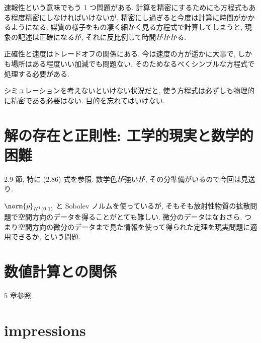 \documentclass[openany, a4paper, oneside]{jsbook}
\begin{document}
速報性という意味でもう 1 つ問題がある.
計算を精密にするためにも方程式もある程度精密にしなければいけないが, 精密にし過ぎると今度は計算に時間がかかるようになる.
媒質の様子をもの凄く細かく見る方程式で計算してしまうと, 現象の記述は正確になるが, それに反比例して時間がかかる.

正確性と速度はトレードオフの関係にある.
今は速度の方が遥かに大事で, しかも場所はある程度いい加減でも問題ない.
そのためなるべくシンプルな方程式で処理する必要がある.

シミュレーションを考えないといけない状況だと, 使う方程式は必ずしも物理的に精密である必要はない.
目的を忘れてはいけない.
\section{解の存在と正則性: 工学的現実と数学的困難}

\cite{NoborizakaOnishiYamamoto1} 2.9 節, 特に (2.86) 式を参照.
数学色が強いが, その分準備がいるので今回は見送り.

$\norm{p}_{H^1 (0,1)}$ と Sobolev ノルムを使っているが,
そもそも放射性物質の拡散問題で空間方向のデータを得ることがとても難しい.
微分のデータはなおさら.
つまり空間方向の微分のデータまで見た情報を使って得られた定理を現実問題に適用できるか, という問題.
\section{数値計算との関係}

\cite{KimYamamoto1} 5 章参照.
\section{impressions}
\end{document}
